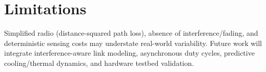 \section{Limitations}
Simplified radio (distance-squared path loss), absence of interference/fading, and deterministic sensing costs may understate real-world variability. Future work will integrate interference-aware link modeling, asynchronous duty cycles, predictive cooling/thermal dynamics, and hardware testbed validation.
